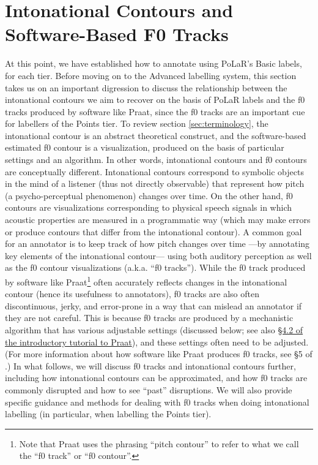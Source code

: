 \documentclass[11pt, twoside]{memoir}
\begin{document}
\section{Intonational Contours and Software-Based F0 Tracks}\label{sec:intonational-contours-and-software-based-pitch-tracks}
At this point, we have established how to annotate using PoLaR’s Basic labels, for each tier. Before moving on to the Advanced labelling system, this section takes us on an important digression to discuss the relationship between the intonational contours we aim to recover on the basis of PoLaR labels and the f0 tracks produced by software like Praat, since the f0 tracks are an important cue for labellers of the Points tier.
To review section \ref{sec:terminology}, the intonational contour is an abstract theoretical construct, and the software-based estimated f0 contour is a visualization, produced on the basis of particular settings and an algorithm. In other words, intonational contours and f0 contours are conceptually different. Intonational contours correspond to symbolic objects in the mind of a listener (thus not directly observable) that represent how pitch (a psycho-perceptual phenomenon) changes over time. On the other hand, f0 contours are visualizations corresponding to physical speech signals in which acoustic properties are measured in a programmatic way (which may make errors or produce contours that differ from the intonational contour).
A common goal for an annotator is to keep track of how pitch changes over time —by annotating key elements of the intonational contour— using both auditory perception as well as the f0 contour visualizations (a.k.a. “f0 tracks”). While the f0 track produced by software like Praat\footnote{Note that Praat uses the phrasing “pitch contour” to refer to what we call the “f0 track” or “f0 contour”.} often accurately reflects changes in the intonational contour (hence its usefulness to annotators), f0 tracks are also often discontinuous, jerky, and error-prone in a way that can mislead an annotator if they are not careful. This is because f0 tracks are produced by a mechanistic algorithm that has various adjustable settings (discussed below; see also \href{https://www.fon.hum.uva.nl/praat/manual/Intro_4_2__Configuring_the_pitch_contour.html}{§4.2 of the introductory tutorial to Praat}), and these settings often need to be adjusted. (For more information about how software like Praat produces f0 tracks, see §5 of \citealt{weenink20}.)
In what follows, we will discuss f0 tracks and intonational contours further, including how intonational contours can be approximated, and how f0 tracks are commonly disrupted and how to see “past” disruptions. We will also provide specific guidance and methods for dealing with f0 tracks when doing intonational labelling (in particular, when labelling the Points tier).
\end{document}
